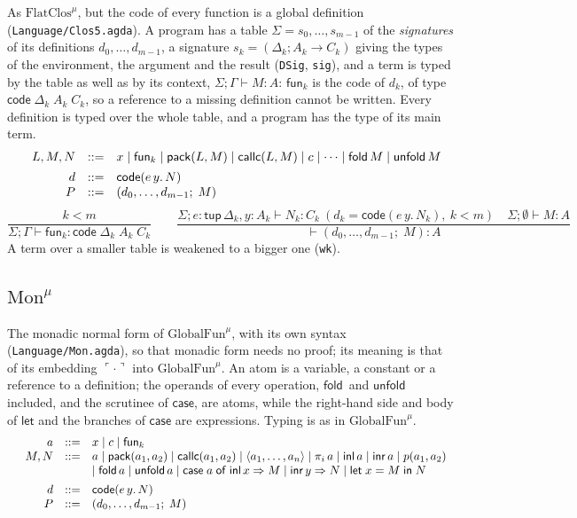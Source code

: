 \documentclass[10pt]{article}
\makeatletter
\theoremstyle{acmplain}
\newcommand{\key}[1]{\mathsf{#1}}
\newcommand{\Let}{\key{let}\;}
\newcommand{\In}{\;\key{in}\;}
\newcommand{\inl}{\key{inl}\,}
\newcommand{\inr}{\key{inr}\,}
\newcommand{\Case}[5]{\key{case}\;#1\;\key{of}\;\key{inl}\,#2 \Rightarrow #3 \mid \key{inr}\,#4 \Rightarrow #5}
\newcommand{\tuple}[1]{\langle #1 \rangle}
\newcommand{\prj}[1]{\pi_{#1}\,}
\newcommand{\funref}[1]{\key{fun}_{#1}}
\newcommand{\prim}[3]{#1(#2, #3)}
\newcommand{\Tcodetm}[3]{\key{code}(#1\,#2.\,#3)}  %
\newcommand{\Tpack}[2]{\key{pack}(#1, #2)}     %
\newcommand{\Tcallc}[2]{\key{callc}(#1, #2)}   %
\newcommand{\Tembed}[1]{\ulcorner #1 \urcorner}  %
\newcommand{\Ml}[1]{\textrm{#1}^{\mu}}                  %
\newcommand{\Mtup}[1]{\key{tup}\,#1}                      %
\newcommand{\Mcodety}[3]{\key{code}\;#1\;#2\;#3}          %
\newcommand{\Mfold}{\key{fold}\,}
\newcommand{\Munfold}{\key{unfold}\,}
\newenvironment{syntax}{\[\begin{array}{l@{\quad}rcl}}{\end{array}\]}
\makeatother
\begin{document}
As $\Ml{FlatClos}$, but the code of every function is a global definition
(\texttt{Language/Clos5.agda}). A program has a table
$\Sigma = s_0, \ldots, s_{m-1}$ of the \emph{signatures} of its
definitions $d_0, \ldots, d_{m-1}$, a signature $s_k = (\Delta_k; A_k \to
C_k)$ giving the types of the environment, the argument and the result
(\texttt{DSig}, \texttt{sig}), and a term is typed by the table as well as
by its context, $\Sigma; \Gamma \vdash M : A$: $\funref{k}$ is the code of
$d_k$, of type $\Mcodety{\Delta_k}{A_k}{C_k}$, so a reference to a missing
definition cannot be written. Every definition is typed over the whole
table, and a program has the type of its main term.
\begin{syntax}
  & L, M, N &::=& x \mid \funref{k} \mid \Tpack{L}{M} \mid \Tcallc{L}{M}
    \mid c \mid \cdots \mid \Mfold M \mid \Munfold M \\[1ex]
  & d &::=& \Tcodetm{e}{y}{N} \\
  & P &::=& (d_0, \ldots, d_{m-1};\; M)
\end{syntax}
\[
  \frac{k < m}{\Sigma; \Gamma \vdash \funref{k} : \Mcodety{\Delta_k}{A_k}{C_k}}
  \qquad
  \frac{\Sigma; e{:}\Mtup{\Delta_k}, y{:}A_k \vdash N_k : C_k \ (d_k = \Tcodetm{e}{y}{N_k},\ k < m)
        \quad \Sigma; \emptyset \vdash M : A}
       {\vdash (d_0, \ldots, d_{m-1};\; M) : A}
\]
A term over a smaller table is weakened to a bigger one (\texttt{wk}).

\subsection{\texorpdfstring{$\Ml{Mon}$}{Mon-mu}}

The monadic normal form of $\Ml{GlobalFun}$, with its own syntax
(\texttt{Language/Mon.agda}), so that monadic form needs no proof; its
meaning is that of its embedding $\Tembed{\cdot}$ into $\Ml{GlobalFun}$. An
atom is a variable, a constant or a reference to a definition; the
operands of every operation, $\Mfold$ and $\Munfold$ included, and the
scrutinee of $\key{case}$, are atoms, while the right-hand side and body
of $\key{let}$ and the branches of $\key{case}$ are expressions. Typing is
as in $\Ml{GlobalFun}$.
\begin{syntax}
  & a &::=& x \mid c \mid \funref{k} \\
  & M, N &::=& a \mid \Tpack{a_1}{a_2} \mid \Tcallc{a_1}{a_2}
    \mid \tuple{a_1,\ldots,a_n} \mid \prj{i} a \mid \inl a \mid \inr a
    \mid \prim{p}{a_1}{a_2} \\
  &&& \mid \Mfold a \mid \Munfold a
    \mid \Case{a}{x}{M}{y}{N} \mid \Let x = M \In N \\[1ex]
  & d &::=& \Tcodetm{e}{y}{N} \\
  & P &::=& (d_0, \ldots, d_{m-1};\; M)
\end{syntax}
\end{document}

